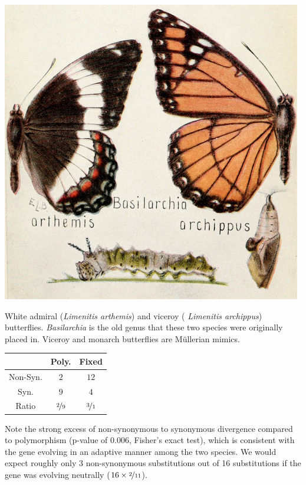 \begin{marginfigure}
\begin{center}
\includegraphics[width=\textwidth]{illustration_images/Genetic_drift/Basilarchia_arthemis_archippus/Basilarchia_arthemis_archippus.png}
\end{center}
\caption{White admiral ({\it Limenitis arthemis}) and viceroy ({\it
    Limenitis archippus}) butterflies.  {\it Basilarchia} is the old genus that these two species were originally placed in. Viceroy and monarch butterflies are M\"ullerian mimics. } \label{fig:Limenitis}
\end{marginfigure}
\begin{center}
\begin{tabular}{ccc}
 & Poly. & Fixed  \\
 \hline
Non-Syn. &    $2$  &   $12$ \\
Syn. &    $9$   &     $4$  \\
Ratio & $\nicefrac{2}{9}$  & $\nicefrac{3}{1}$
\end{tabular}
\end{center}
Note the strong excess of non-synonymous to synonymous divergence
compared to polymorphism (p-value of $0.006$, Fisher's exact test),
which is consistent with the gene evolving in an adaptive manner among
the two species. We would expect roughly only $3$ non-synonymous
substitutions out of 16 substitutions if the gene was evolving
neutrally ($ 16 \times \nicefrac{2}{11}$).


